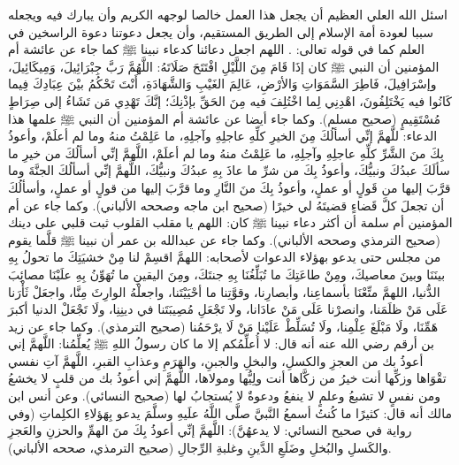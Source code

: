 اسئل الله العلي العظيم أن يجعل هذا العمل خالصا لوجهه الكريم وأن يبارك فيه ويجعله سببا لعودة أمة الإسلام إلى الطريق المستقيم، وأن يجعل دعوتنا دعوة الراسخين في العلم كما في قوله تعالى:
\quranayah*[3][7][32]\quranayah*[3][8]{\footnotesize \surahname*[3]}. اللهم اجعل دعائنا كدعاء نبينا ﷺ كما جاء عن عائشة أم المؤمنين أن النبي ﷺ كان إذَا قَامَ مِنَ اللَّيْلِ افْتَتَحَ صَلَاتَهُ: اللَّهُمَّ رَبَّ جِبْرَائِيلَ، وَمِيكَائِيلَ، وإسْرَافِيلَ، فَاطِرَ السَّمَوَاتِ وَالأرْضِ، عَالِمَ الغَيْبِ وَالشَّهَادَةِ، أَنْتَ تَحْكُمُ بيْنَ عِبَادِكَ فِيما كَانُوا فيه يَخْتَلِفُونَ، اهْدِنِي لِما اخْتُلِفَ فيه مِنَ الحَقِّ بإذْنِكَ؛ إنَّكَ تَهْدِي مَن تَشَاءُ إلى صِرَاطٍ مُسْتَقِيمٍ {\footnotesize (صحيح مسلم)}. وكما جاء أيضا عن عائشة أم المؤمنين أن النبي ﷺ علمها هذا الدعاء: 
للَّهمَّ إنِّي أسألُكَ مِنَ الخيرِ كلِّهِ عاجلِهِ وآجلِهِ، ما عَلِمْتُ منهُ وما لم أعلَمْ، وأعوذُ بِكَ منَ الشَّرِّ كلِّهِ عاجلِهِ وآجلِهِ، ما عَلِمْتُ منهُ وما لم أعلَمْ، اللَّهمَّ إنِّي أسألُكَ من خيرِ ما سألَكَ عبدُكَ ونبيُّكَ، وأعوذُ بِكَ من شرِّ ما عاذَ بِهِ عبدُكَ ونبيُّكَ، اللَّهمَّ إنِّي أسألُكَ الجنَّةَ وما قرَّبَ إليها من قَولٍ أو عملٍ، وأعوذُ بِكَ منَ النَّارِ وما قرَّبَ إليها من قولٍ أو عملٍ، وأسألُكَ أن تجعلَ كلَّ قَضاءٍ قضيتَهُ لي خيرًا {\footnotesize (صحيح ابن ماجه وصححه الألباني)}. وكما جاء عن أم المؤمنين أم سلمة أن أكثر دعاء نبينا ﷺ كان: اللهم يا مقلب القلوب ثبت قلبي على دينك {\footnotesize (صحيح الترمذي وصححه الألباني)}.  وكما جاء عن عبدالله بن عمر أن نبينا ﷺ قلَّما يقوم من مجلس حتى يدعو بهؤلاء الدعوات لأصحابه: اللهمَّ اقسِمْ لنا مِنْ خشيَتِكَ ما تحولُ بِهِ بينَنَا وبينَ معاصيكَ، ومِنْ طاعَتِكَ ما تُبَلِّغُنَا بِهِ جنتَكَ، ومِنَ اليقينِ ما تُهَوِّنُ بِهِ علَيْنَا مصائِبَ الدُّنيا، اللهمَّ متِّعْنَا بأسماعِنا، وأبصارِنا، وقوَّتِنا ما أحْيَيْتَنا، واجعلْهُ الوارِثَ مِنَّا، واجعَلْ ثَأْرَنا عَلَى مَنْ ظلَمَنا، وانصرْنا عَلَى مَنْ عادَانا، ولا تَجْعَلِ مُصِيبَتَنا في دينِنِا، ولَا تَجْعَلْ الدنيا أكبرَ هَمِّنَا، ولَا مَبْلَغَ عِلْمِنا، ولَا تُسَلِّطْ عَلَيْنا مَنْ لَا يرْحَمُنا {\footnotesize (صحيح الترمذي)}. وكما جاء عن زيد بن أرقم رضي الله عنه أنه قال: لا أُعلِّمُكم إلا ما كان رسولُ اللهِ ﷺ يُعلِّمُنا: اللَّهمَّ إني أعوذُ بك من العجزِ والكسلِ، والبخلِ والجبنِ، والهَرَمِ وعذابِ القبرِ، اللَّهمَّ آتِ نفسي تقْوَاها وزكِّها أنت خيرُ من زكَّاها أنت ولِيُّها ومولاها، اللَّهمَّ إني أعوذُ بك من قلبٍ لا يخشعُ ومن نفسٍ لا تشبعُ وعلمٍ لا ينفعُ ودعوةٌ لا يُستجابُ لها {\footnotesize (صحيح النسائي)}. وعن أنس ابن مالك أنه قال: كثيرًا ما كُنتُ أسمعُ النَّبيَّ صلَّى اللَّهُ علَيهِ وسلَّمَ يدعو بِهَؤلاءِ الكلِماتِ (وفي رواية في صحيح النسائي: لا يدعهُنَّ): اللَّهمَّ إنِّي أعوذُ بِكَ منَ الهمِّ والحزنِ والعَجزِ والكَسلِ والبُخلِ وضَلَعِ الدَّينِ وغلبةِ الرِّجالِ {\footnotesize (صحيح الترمذي، صححه الألباني)}.



